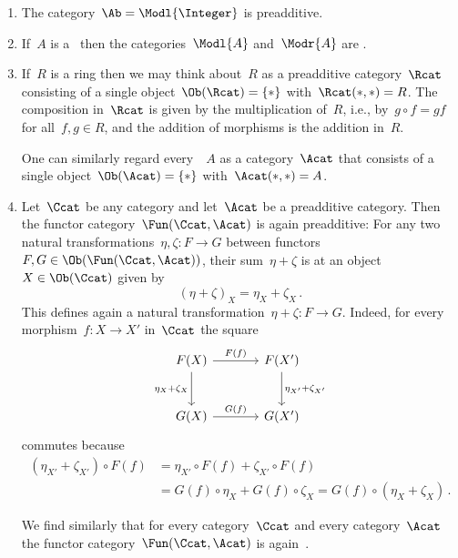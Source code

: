 \begin{example}
  \leavevmode
  \begin{enumerate}
    \item
      The category~$\Ab = \Modl{\Integer}$ is preadditive.
    \item
      If~$A$ is a~{\kalg} then the categories~$\Modl{A}$ and~$\Modr{A}$ are {\preklin}.
    \item
      If~$R$ is a ring then we may think about~$R$ as a preadditive category~$\Rcat$ consisting of a single object~$\Ob(\Rcat) = \{ \ast \}$ with~$\Rcat(\ast,\ast) = R$.
      The composition in~$\Rcat$ is given by the multiplication of~$R$, i.e., by~$g \circ f = gf$ for all~$f, g \in R$, and the addition of morphisms is the addition in~$R$.
      
      One can similarly regard every~{\kalg}~$A$ as a {\preklin} category~$\Acat$ that consists of a single object~$\Ob(\Acat) = \{\ast\}$ with~$\Acat(\ast,\ast) = A$.
    \item
      Let~$\Ccat$ be any category and let~$\Acat$ be a preadditive category.
      Then the functor category~$\Fun(\Ccat, \Acat)$ is again preadditive:
      For any two natural transformations~$\eta, \zeta \colon F \to G$ between functors~$F, G \in \Ob(\Fun(\Ccat, \Acat))$, their sum~$\eta + \zeta$ is at an object~$X \in \Ob(\Ccat)$ given by
      \[
          (\eta + \zeta)_X
        = \eta_X + \zeta_X \,.
      \]
      This defines again a natural transformation~$\eta + \zeta \colon F \to G$.
      Indeed, for every morphism~$f \colon X \to X'$ in~$\Ccat$ the square
      \[
        \begin{tikzcd}[sep = large]
            F(X)
            \arrow{r}[above]{F(f)}
            \arrow{d}[left]{\eta_X + \zeta_X}
          & F(X')
            \arrow{d}[right]{\eta_{X'} + \zeta_{X'}}
          \\
            G(X)
            \arrow{r}[above]{G(f)}
          & G(X')
        \end{tikzcd}
      \]
      commutes because
      \begin{align*}
            (\eta_{X'} + \zeta_{X'}) \circ F(f)
        &=  \eta_{X'} \circ F(f) + \zeta_{X'} \circ F(f)  \\
        &=  G(f) \circ \eta_X + G(f) \circ \zeta_X
         =  G(f) \circ (\eta_X + \zeta_X) \,.
      \end{align*}
      
      We find similarly that for every category~$\Ccat$ and every {\preklin} category~$\Acat$ the functor category~$\Fun(\Ccat, \Acat)$ is again~{\preklin}. 
  \end{enumerate}
\end{example}


